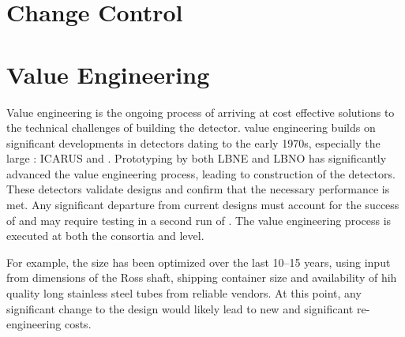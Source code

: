 \section{Change Control}
\label{sec:fdsp-change}



\section{Value Engineering}
\label{sec:fdsp-coord-ve}

Value engineering is the ongoing process of arriving at cost effective
solutions to the technical challenges of building the 
detector.  value engineering builds on significant
developments in  detectors dating to the early 1970s,
especially the large : ICARUS and
. Prototyping by both LBNE and LBNO has
significantly advanced the value engineering process, leading to
construction of the  detectors. These detectors validate
 designs and confirm that the necessary performance is
met. Any significant departure from current designs must account for
the success of  and may require testing in a second
run of . The value engineering process is executed at
both the consortia and  level.

For example, the  size has been optimized over the last 10--15 years,
using input from dimensions of the Ross shaft, shipping container size
and availability of hih quality long stainless steel tubes from reliable vendors.
At this point, any significant change to the  design would likely
lead to new and significant re-engineering costs.


